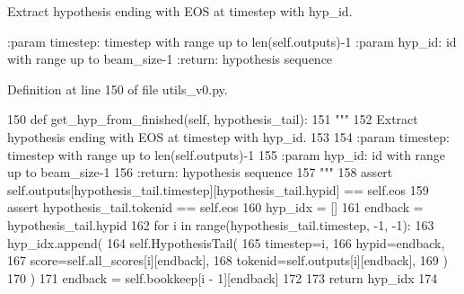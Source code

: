 \begin{DoxyVerb}Extract hypothesis ending with EOS at timestep with hyp_id.

:param timestep: timestep with range up to len(self.outputs)-1
:param hyp_id: id with range up to beam_size-1
:return: hypothesis sequence
\end{DoxyVerb}
 

Definition at line 150 of file utils\+\_\+v0.\+py.


\begin{DoxyCode}
150     \textcolor{keyword}{def }get\_hyp\_from\_finished(self, hypothesis\_tail):
151         \textcolor{stringliteral}{"""}
152 \textcolor{stringliteral}{        Extract hypothesis ending with EOS at timestep with hyp\_id.}
153 \textcolor{stringliteral}{}
154 \textcolor{stringliteral}{        :param timestep: timestep with range up to len(self.outputs)-1}
155 \textcolor{stringliteral}{        :param hyp\_id: id with range up to beam\_size-1}
156 \textcolor{stringliteral}{        :return: hypothesis sequence}
157 \textcolor{stringliteral}{        """}
158         \textcolor{keyword}{assert} self.outputs[hypothesis\_tail.timestep][hypothesis\_tail.hypid] == self.eos
159         \textcolor{keyword}{assert} hypothesis\_tail.tokenid == self.eos
160         hyp\_idx = []
161         endback = hypothesis\_tail.hypid
162         \textcolor{keywordflow}{for} i \textcolor{keywordflow}{in} range(hypothesis\_tail.timestep, -1, -1):
163             hyp\_idx.append(
164                 self.HypothesisTail(
165                     timestep=i,
166                     hypid=endback,
167                     score=self.all\_scores[i][endback],
168                     tokenid=self.outputs[i][endback],
169                 )
170             )
171             endback = self.bookkeep[i - 1][endback]
172 
173         \textcolor{keywordflow}{return} hyp\_idx
174 
\end{DoxyCode}
\mbox{\label{classparlai_1_1agents_1_1legacy__agents_1_1seq2seq_1_1utils__v0_1_1Beam_a76fadcbf18352eb7f2d741e9b04e0a6a}} 
